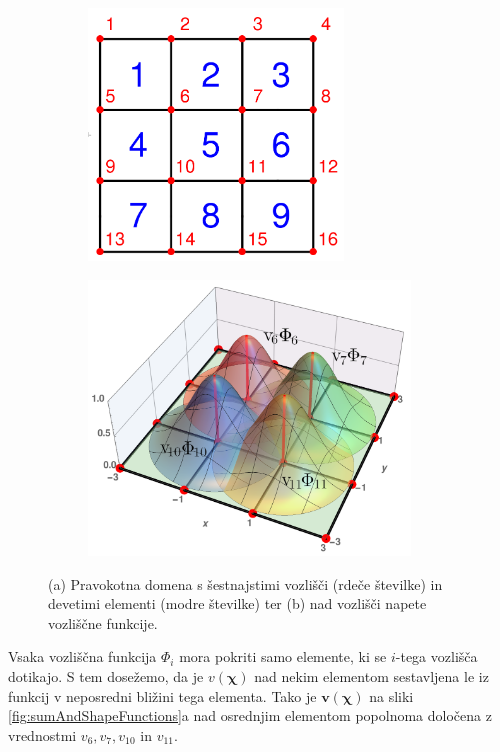 \begin{figure}[ht]
    \begin{subfigure}[b]{0.42\textwidth}
        \centering
        \includegraphics[height=67mm]{Slike/undeformedRegion.png}
        \vspace{6mm}
        \caption{}
    \end{subfigure}
    \begin{subfigure}[b]{0.55\textwidth}
        \centering
        \includegraphics[width=0.94\textwidth]{Slike/undeformedNodeFs.png}
        \caption{}
    \end{subfigure}
    \caption{(a) Pravokotna domena s šestnajstimi vozlišči (rdeče številke) in devetimi elementi (modre številke) ter (b) nad vozlišči napete vozliščne funkcije.}
    \label{fig:regionAndNodeFunctions}
\end{figure}

Vsaka vozliščna funkcija $\Phi_i$ mora pokriti samo elemente, ki se $i$-tega vozlišča dotikajo. S tem dosežemo, da je $v(\bm\chi)$ nad nekim elementom sestavljena le iz funkcij v neposredni bližini tega elementa. Tako je $\mathbf{v}(\bm\chi)$ na sliki \ref{fig:sumAndShapeFunctions}a nad osrednjim elementom popolnoma določena z vrednostmi $v_6, v_7, v_{10}$ in $v_{11}$.

